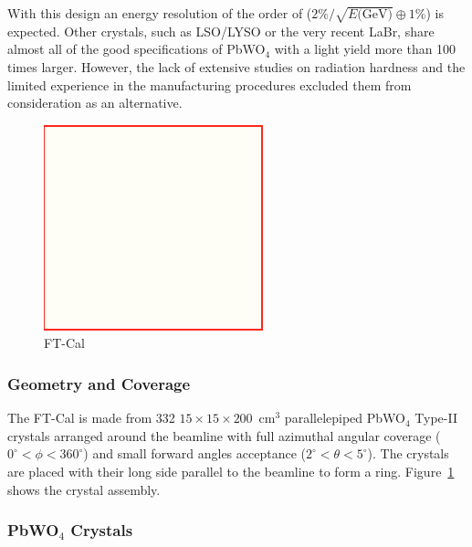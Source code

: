 With this design an energy resolution of the order of ($2\% /\sqrt{E\textrm{(GeV)}} \oplus 1\%$) is expected.
Other crystals, such as LSO/LYSO or the very recent LaBr, share almost all of the good specifications of
PbWO$_4$ with a light yield more than 100 times larger. However, the lack of extensive studies on radiation
hardness and the limited experience in the manufacturing procedures excluded them from consideration as an
alternative.

\begin{figure}[th!]
\centering 
\includegraphics[width=0.85\columnwidth]{fig/dummy.png} 
\caption{FT-Cal} 
\label{fig:ft-cal-geometry} 
\end{figure}

\subsubsection{Geometry and Coverage}

The FT-Cal is made from 332 $15\times 15\times 200$~cm$^3$ parallelepiped PbWO$_4$ Type-II crystals
arranged around the beamline with full azimuthal angular coverage ($0^\circ < \phi < 360^\circ$)  and small
forward angles acceptance ($2^\circ < \theta < 5^\circ$). The crystals are placed with their long side parallel to
the beamline to form a ring. Figure~\ref{fig:ft-cal-geometry} shows the crystal assembly. 

\subsubsection{PbWO$_4$ Crystals}

